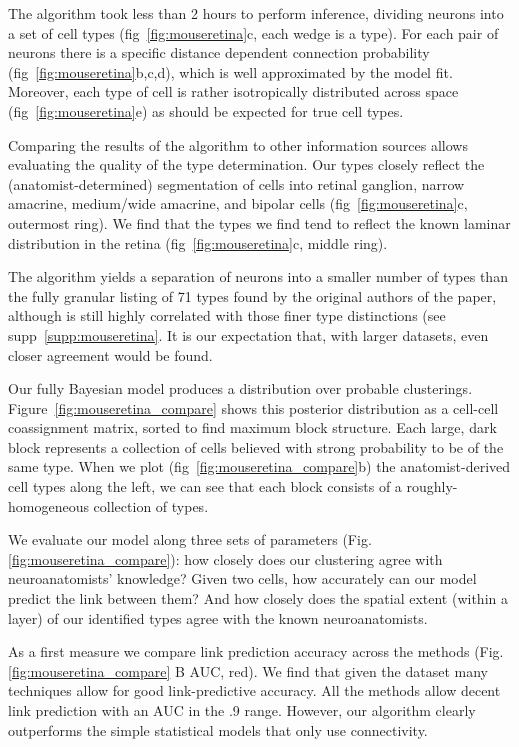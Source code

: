 \documentclass{article}
\begin{document}
The algorithm took less than 2 hours to perform inference, dividing
neurons into a set of cell types (fig~\ref{fig:mouseretina}c, each
wedge is a type). For each pair of neurons there is a specific
distance dependent connection probability
(fig~\ref{fig:mouseretina}b,c,d), which is well approximated by the
model fit. Moreover, each type of cell is rather isotropically
distributed across space (fig~\ref{fig:mouseretina}e) as should be
expected for true cell types.

Comparing the results of the algorithm to other information sources
allows evaluating the quality of the type determination. Our types
closely reflect the (anatomist-determined) segmentation of cells into
retinal ganglion, narrow amacrine, medium/wide amacrine, and bipolar
cells (fig~\ref{fig:mouseretina}c, outermost ring). We find that the
types we find tend to reflect the known laminar distribution in the
retina (fig~\ref{fig:mouseretina}c, middle ring). 

The algorithm yields a separation of neurons into a smaller number of
types than the fully granular listing of 71 types found by the
original authors of the paper, although is still highly correlated
with those finer type distinctions (see
supp~\ref{supp:mouseretina}. It is our expectation that, with larger
datasets, even closer agreement would be found.

Our fully Bayesian model produces a distribution over probable
clusterings.  Figure~\ref{fig:mouseretina_compare} shows this
posterior distribution as a cell-cell coassignment matrix, sorted to
find maximum block structure. Each large, dark block represents a
collection of cells believed with strong probability to be of the same
type. When we plot (fig~\ref{fig:mouseretina_compare}b) the
anatomist-derived cell types along the left, we can see that each
block consists of a roughly-homogeneous collection of types. 

We evaluate our model along three sets of parameters
(Fig.\ref{fig:mouseretina_compare}): how closely does our clustering agree
with neuroanatomists' knowledge?  Given two cells, how accurately can
our model predict the link between them? And how closely does the
spatial extent (within a layer) of our identified types agree with the
known neuroanatomists.

As a first measure we compare link prediction accuracy across the
methods (Fig.\ref{fig:mouseretina_compare} B AUC, red).  We find that
given the dataset many techniques allow for good link-predictive
accuracy. All the methods allow decent link prediction with an AUC in
the .9 range. However, our algorithm clearly outperforms the simple
statistical models that only use connectivity.
\end{document}
